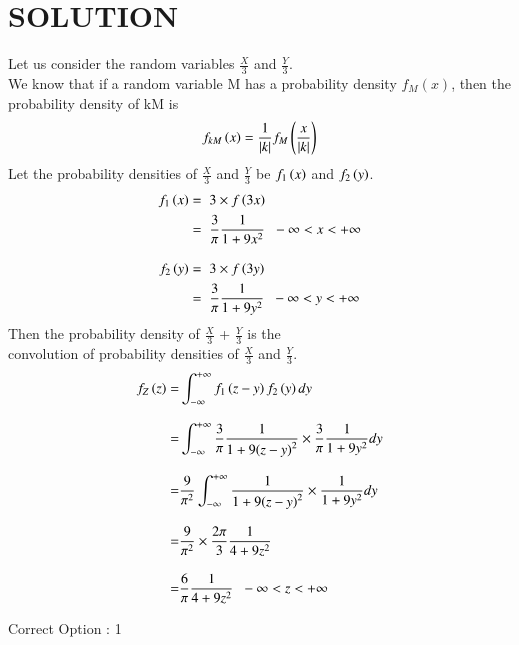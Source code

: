 \documentclass[journal,12pt,twocolumn]{IEEEtran}
\begin{document}
        \section*{SOLUTION}
        Let us consider the random variables $\displaystyle\frac{X}{3}$ and $\displaystyle\frac{Y}{3}$.\\[0.3cm]
We know that if a random variable M has a probability density $f_M(x)$, then the probability density of kM is
\begin{align}
    f_{kM}\left(x\right) = \frac{1}{\vert k\vert} f_M\left(\frac{x}{\vert k\vert}\right)
\end{align}
Let the probability densities of $\displaystyle\frac{X}{3}$ and $\displaystyle\frac{Y}{3}$ be $f_{1}\left(x\right)$ and $f_{2}\left(y\right)$.
\begin{align}
    f_{1}\left(x\right) = & \hspace{0.2cm} 3\times f\left(3x\right)                                                                \\
    =               & \hspace{0.2cm} \displaystyle\frac{3}{\pi} \frac{1}{1+9{x}^2} \hspace{0.2cm}-\infty < x < +\infty \\[0.3cm]
    f_{2}\left(y\right) = & \hspace{0.2cm} 3\times f\left(3y\right)                                                                \\
    =               & \hspace{0.2cm} \displaystyle\frac{3}{\pi} \frac{1}{1+9{y}^2} \hspace{0.2cm}-\infty < y < +\infty
\end{align}
Then the probability density of $\displaystyle\frac{X}{3}$ + $\displaystyle\frac{Y}{3}$ is the\\[0.1cm]convolution of probability densities of $\displaystyle\frac{X}{3}$ and $\displaystyle\frac{Y}{3}$.
\begin{align}
    f_{Z}\left(z\right) = & \int_{-\infty}^{+\infty} f_{1}\left(z-y\right) f_{2}\left(y\right) dy                                                                              \\[0.3cm]
    =               & \int_{-\infty}^{+\infty} \displaystyle\frac{3}{\pi}\frac{1}{1+9{\left(z-y\right)^2}}\times\displaystyle\frac{3}{\pi} \frac{1}{1+9{{y}^2}} dy \\[0.3cm]
    =               & \frac{9}{{\pi}^2} \int_{-\infty}^{+\infty} \frac{1}{1+9{\left(z-y\right)^2}}\times\frac{1}{1+9{{y}^2}} dy                                    \\[0.3cm]
    =               & \frac{9}{{\pi}^2}\times\frac{2\pi}{3} \displaystyle\frac{1}{4 + 9{z}^2}                                                                \\[0.3cm]
    =               & \frac{6}{\pi} \displaystyle\frac{1}{4 + 9{z}^2}\hspace{0.2cm}-\infty < z < +\infty
\end{align}
\begin{center}
    Correct Option : 1
\end{center}
\end{document}
